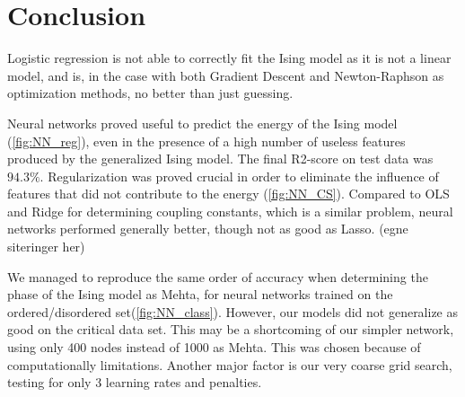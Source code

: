 \section{Conclusion}\label{sec:Conclusion}

Logistic regression is not able to correctly fit the Ising model as it is not a linear model, and is, in the case with both Gradient Descent and Newton-Raphson as optimization methods, no better than just guessing.


Neural networks proved useful to predict the energy of the Ising model (\autoref{fig:NN_reg}), even in the presence of a high number of useless features produced by the generalized Ising model. The final R2-score on test data was $94.3\%$. Regularization was proved crucial in order to eliminate the influence of features that did not contribute to the energy (\autoref{fig:NN_CS}). Compared to OLS and Ridge for determining coupling constants, which is a similar problem, neural networks performed generally better, though not as good as Lasso. (egne siteringer her)

We managed to reproduce the same order of accuracy when determining the phase of the Ising model as Mehta, for neural networks trained on the ordered/disordered set(\autoref{fig:NN_class}). However, our models did not generalize as good on the critical data set. This may be a shortcoming of our simpler network, using only 400 nodes instead of 1000 as Mehta. This was chosen because of computationally limitations. Another major factor is our very coarse grid search, testing for only 3 learning rates and penalties. 